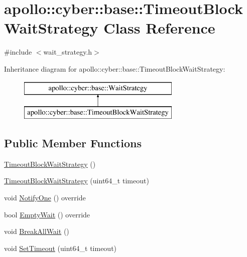 \hypertarget{classapollo_1_1cyber_1_1base_1_1TimeoutBlockWaitStrategy}{\section{apollo\-:\-:cyber\-:\-:base\-:\-:Timeout\-Block\-Wait\-Strategy Class Reference}
\label{classapollo_1_1cyber_1_1base_1_1TimeoutBlockWaitStrategy}
}


{\ttfamily \#include $<$wait\-\_\-strategy.\-h$>$}

Inheritance diagram for apollo\-:\-:cyber\-:\-:base\-:\-:Timeout\-Block\-Wait\-Strategy\-:\begin{figure}[H]
\begin{center}
\leavevmode
\includegraphics[height=2.000000cm]{classapollo_1_1cyber_1_1base_1_1TimeoutBlockWaitStrategy}
\end{center}
\end{figure}
\subsection*{Public Member Functions}
\begin{DoxyCompactItemize}
\item 
\hyperlink{classapollo_1_1cyber_1_1base_1_1TimeoutBlockWaitStrategy_ac2250cd47422b7a04fa90d1f01b64df7}{Timeout\-Block\-Wait\-Strategy} ()
\item 
\hyperlink{classapollo_1_1cyber_1_1base_1_1TimeoutBlockWaitStrategy_ab44d7baaa734ad8b03c049c225c017ae}{Timeout\-Block\-Wait\-Strategy} (uint64\-\_\-t timeout)
\item 
void \hyperlink{classapollo_1_1cyber_1_1base_1_1TimeoutBlockWaitStrategy_a4041a8f72141780fdd6e805c793dcc51}{Notify\-One} () override
\item 
bool \hyperlink{classapollo_1_1cyber_1_1base_1_1TimeoutBlockWaitStrategy_a044671ac4289fdf17fc961a4919c8c7f}{Empty\-Wait} () override
\item 
void \hyperlink{classapollo_1_1cyber_1_1base_1_1TimeoutBlockWaitStrategy_afbd51fc01be0cee88a3218e559d4fe81}{Break\-All\-Wait} ()
\item 
void \hyperlink{classapollo_1_1cyber_1_1base_1_1TimeoutBlockWaitStrategy_a431a2d9c252544b0b8264d13c7db8ab1}{Set\-Timeout} (uint64\-\_\-t timeout)
\end{DoxyCompactItemize}
